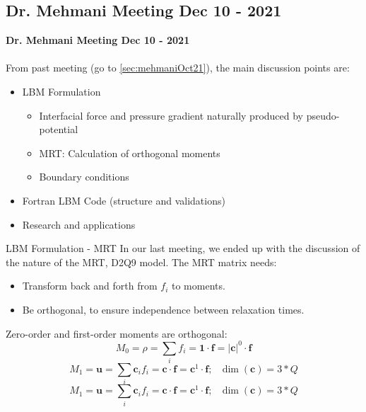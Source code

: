 \documentclass{beamer}
\begin{document}
	
	\subsection{Dr. Mehmani Meeting Dec 10 - 2021}
	\label{sec:mehmaniDec21}
	\justifying
	\begin{frame}
		\textbf{Dr. Mehmani Meeting Dec 10 - 2021}\\~\\
		From past meeting (go to \ref{sec:mehmaniOct21}), the main discussion points are:
		\begin{itemize}
			\item LBM Formulation
			\begin{itemize}
				\item Interfacial force and pressure gradient naturally produced by pseudo-potential
				\item MRT: Calculation of orthogonal moments
				\item Boundary conditions
			\end{itemize}
			\item Fortran LBM Code (structure and validations)
			\item Research and applications
		\end{itemize}
	\end{frame}

	
	\begin{frame}{LBM Formulation - MRT}
		In our last meeting, we ended up with the discussion of the nature of the MRT, D2Q9 model. The MRT matrix needs:
		\begin{itemize}
			\item Transform back and forth from $f_i$ to moments.
			\item Be orthogonal, to ensure independence between relaxation times.
		\end{itemize}
		Zero-order and first-order moments are orthogonal:
		\begin{equation*}
			M_0 = \rho = \sum_i f_i = \mathbf{1} \cdot \mathbf{f} = |\mathbf{c}|^{0} \cdot \mathbf{f}
		\end{equation*}
		\begin{equation*}
		 M_1 =\mathbf{u} = \sum_i \mathbf{c}_i f_i  = \mathbf{c} \cdot \mathbf{f} =  \mathbf{c}^1 \cdot \mathbf{f}; \, \, \, \, \dim(\mathbf{c}) = 3*Q
		\end{equation*}
		\begin{equation*}
		M_1 =\mathbf{u} = \sum_i \mathbf{c}_i f_i  = \mathbf{c} \cdot \mathbf{f} =  \mathbf{c}^1 \cdot \mathbf{f}; \, \, \, \, \dim(\mathbf{c}) = 3*Q
		\end{equation*}
	\end{frame}
	
\end{document}
